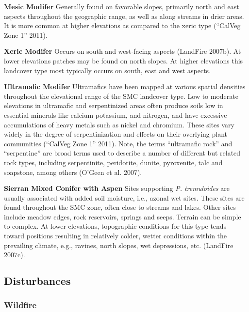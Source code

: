 \begin{adjustwidth}{2cm}{}
\textbf{Mesic Modifer } Generally found on favorable slopes, primarily north and east aspects throughout the geographic range, as well as along streams in drier areas. It is more common at higher elevations as compared to the xeric type (``CalVeg Zone 1'' 2011).

\textbf{Xeric Modifer} Occurs on south and west-facing aspects (LandFire 2007b). At lower elevations patches may be found on north slopes. At higher elevations this landcover type most typically occurs on south, east and west aspects. 

\textbf{Ultramafic Modifer} Ultramafics have been mapped at various spatial densities throughout the elevational range of the SMC landcover type. Low to moderate elevations in ultramafic and serpentinized areas often produce soils low in essential minerals like calcium potassium, and nitrogen, and have excessive accumulations of heavy metals such as nickel and chromium. These sites vary widely in the degree of serpentinization and effects on their overlying plant communities (``CalVeg Zone 1'' 2011). Note, the terms ``ultramafic rock'' and ``serpentine'' are broad terms used to describe a number of different but related rock types, including serpentinite, peridotite, dunite, pyroxenite, talc and soapstone, among others (O’Geen et al. 2007). 

\end{adjustwidth}

\textbf{Sierran Mixed Conifer with Aspen} Sites supporting \emph{P. tremuloides} are usually associated with added soil moisture, i.e., azonal wet sites. These sites are found throughout the SMC zone, often close to streams and lakes. Other sites include meadow edges, rock reservoirs, springs and seeps. Terrain can be simple to complex. At lower elevations, topographic conditions for this type tends toward positions resulting in relatively colder, wetter conditions within the prevailing climate, e.g., ravines, north slopes, wet depressions, etc. (LandFire 2007c).

\subsection*{Disturbances}

\subsubsection{Wildfire}

